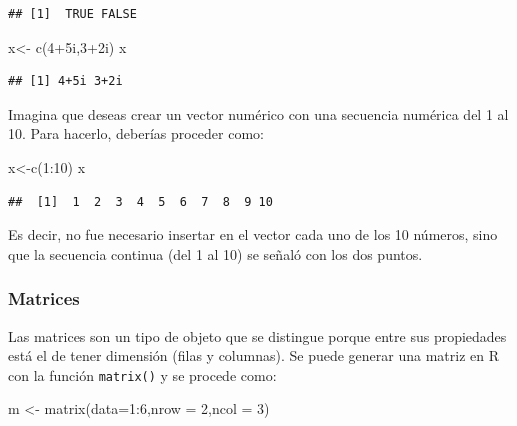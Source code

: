 \documentclass[
  11pt,
  oneside]{book}
\newenvironment{Shaded}{\begin{snugshade}}{\end{snugshade}}
\newcommand{\AttributeTok}[1]{\textcolor[rgb]{0.77,0.63,0.00}{#1}}
\newcommand{\DecValTok}[1]{\textcolor[rgb]{0.00,0.00,0.81}{#1}}
\newcommand{\FunctionTok}[1]{\textcolor[rgb]{0.00,0.00,0.00}{#1}}
\newcommand{\NormalTok}[1]{#1}
\newcommand{\OtherTok}[1]{\textcolor[rgb]{0.56,0.35,0.01}{#1}}
\newcommand{\SpecialCharTok}[1]{\textcolor[rgb]{0.00,0.00,0.00}{#1}}
\begin{document}
\begin{verbatim}
## [1]  TRUE FALSE
\end{verbatim}

\begin{Shaded}
\begin{Highlighting}[]
\NormalTok{x}\OtherTok{\textless{}{-}} \FunctionTok{c}\NormalTok{(}\DecValTok{4}\SpecialCharTok{+}\NormalTok{5i,}\DecValTok{3}\SpecialCharTok{+}\NormalTok{2i)}
\NormalTok{x}
\end{Highlighting}
\end{Shaded}

\begin{verbatim}
## [1] 4+5i 3+2i
\end{verbatim}

Imagina que deseas crear un vector numérico con una secuencia numérica del 1 al 10. Para hacerlo, deberías proceder como:

\begin{Shaded}
\begin{Highlighting}[]
\NormalTok{x}\OtherTok{\textless{}{-}}\FunctionTok{c}\NormalTok{(}\DecValTok{1}\SpecialCharTok{:}\DecValTok{10}\NormalTok{)}
\NormalTok{x}
\end{Highlighting}
\end{Shaded}

\begin{verbatim}
##  [1]  1  2  3  4  5  6  7  8  9 10
\end{verbatim}

Es decir, no fue necesario insertar en el vector cada uno de los 10 números, sino que la secuencia continua (del 1 al 10) se señaló con los dos puntos.

\hypertarget{matrices}{%
\subsubsection{Matrices}\label{matrices}}

Las matrices son un tipo de objeto que se distingue porque entre sus propiedades está el de tener dimensión (filas y columnas). Se puede generar una matriz en R con la función \texttt{matrix()} y se procede como:

\begin{Shaded}
\begin{Highlighting}[]
\NormalTok{m }\OtherTok{\textless{}{-}} \FunctionTok{matrix}\NormalTok{(}\AttributeTok{data=}\DecValTok{1}\SpecialCharTok{:}\DecValTok{6}\NormalTok{,}\AttributeTok{nrow =} \DecValTok{2}\NormalTok{,}\AttributeTok{ncol =} \DecValTok{3}\NormalTok{)}
\end{Highlighting}
\end{Shaded}
\end{document}
